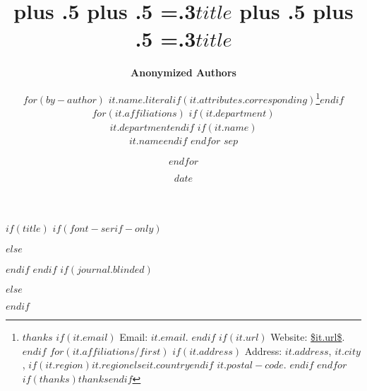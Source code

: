 $if(title)$
$if(font-serif-only)$
\title{\bfseries\huge\parfillskip=0pt
\rightskip=0pt plus .5\textwidth
\leftskip=0pt plus .5\textwidth
\emergencystretch=.3\textwidth $title$}
$else$
\title{\sffamily\bfseries\huge\parfillskip=0pt
\rightskip=0pt plus .5\textwidth
\leftskip=0pt plus .5\textwidth
\emergencystretch=.3\textwidth $title$}
$endif$
$endif$
$if(journal.blinded)$
\author{\textbf{Anonymized Authors}}
$else$
\author{$for(by-author)$
\textbf{$it.name.literal$}$if(it.attributes.corresponding)$\footnote{
$thanks$
$if(it.email)$
Email: \texttt{\href{mailto:$it.email$}{$it.email$}}.
$endif$
$if(it.url)$
Website: \url{$it.url$}.
$endif$
$for(it.affiliations/first)$
$if(it.address)$
Address:
$it.address$, $it.city$, $if(it.region)$$it.region$$else$$it.country$$endif$ $it.postal-code$.
$endif$
$endfor$
$if(thanks)$$thanks$$endif$}$endif$
$for(it.affiliations)$
$if(it.department)$\\$it.department$$endif$%
$if(it.name)$\\$it.name$$endif$%
\vspace{2pt}
$endfor$ $sep$
\and $endfor$}
$endif$
\date{$date$}
